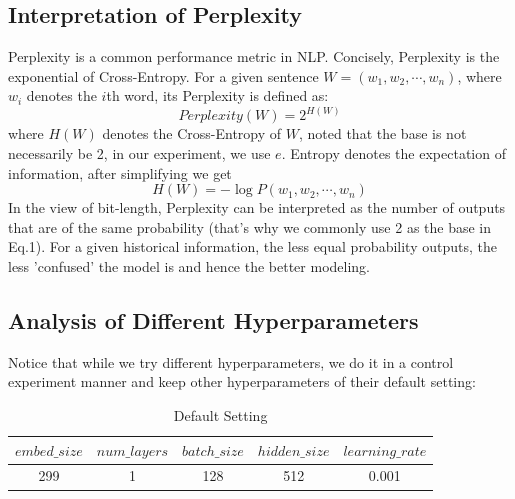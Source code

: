 \subsection{Interpretation of Perplexity}
Perplexity is a common performance metric in NLP. Concisely, Perplexity is the exponential of Cross-Entropy. For a given sentence 
$W = (w_{1}, w_2, \cdots, w_n)$, where $w_{i}$ denotes the $i$th word, its Perplexity is defined as:
\begin{equation}
    Perplexity(W) = 2^{H(W)}
\end{equation}
where $H(W)$ denotes the Cross-Entropy of $W$, noted that the base is not necessarily be 2, in our experiment, we use $e$.
Entropy denotes the expectation of information, after simplifying we get
\begin{equation}
    H(W) = -\log{P(w_{1}, w_2, \cdots, w_n)}
\end{equation}
In the view of bit-length, Perplexity can be interpreted as the number of outputs that are of the same probability (that's why we commonly use 2 as the base in Eq.1). 
For a given historical information, the less equal probability outputs, the less 'confused' the model is and hence the better modeling. 

\subsection{Analysis of Different Hyperparameters}
Notice that while we try different hyperparameters, we do it in a control experiment manner and keep other hyperparameters of their default 
setting:\\
\begin{table}[!ht]
\caption{Default Setting}
\centering
\begin{tabular}{|c|c|c|c|c|}\hline
   $embed\_size$ & $num\_layers$ & $batch\_size$ & $hidden\_size$ & $learning\_rate$ \\ \hline
    299&1&128&512&0.001 \\ \hline
\end{tabular}
\end{table}
